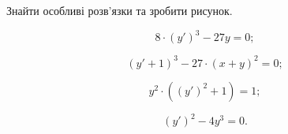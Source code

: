 Знайти особливі розв'язки та зробити рисунок.
\begin{multicols}{2}
	\begin{problem}
		\[8\cdot(y')^3-27y=0;\]
	\end{problem}
	
	\begin{problem}
		\[(y'+1)^3-27\cdot(x+y)^2=0;\]
	\end{problem}

	\begin{problem}
		\[y^2\cdot((y')^2+1)=1;\]
	\end{problem}

	\begin{problem}
		\[(y')^2-4y^3=0.\]
	\end{problem}
\end{multicols}